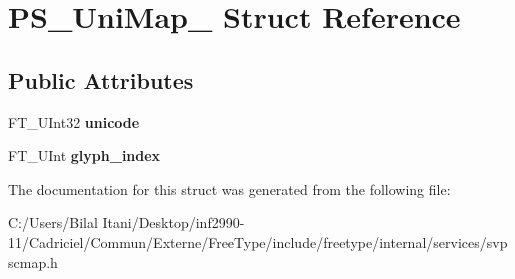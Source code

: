 \hypertarget{struct_p_s___uni_map__}{}\section{P\+S\+\_\+\+Uni\+Map\+\_\+ Struct Reference}
\label{struct_p_s___uni_map__}
\subsection*{Public Attributes}
\begin{DoxyCompactItemize}
\item 
F\+T\+\_\+\+U\+Int32 {\bfseries unicode}\hypertarget{struct_p_s___uni_map___a87c1f471eb4033fc5ed9d0f1ecaf35a1}{}\label{struct_p_s___uni_map___a87c1f471eb4033fc5ed9d0f1ecaf35a1}

\item 
F\+T\+\_\+\+U\+Int {\bfseries glyph\+\_\+index}\hypertarget{struct_p_s___uni_map___a0d5b2e3c405aeab1f1059a3587125cfd}{}\label{struct_p_s___uni_map___a0d5b2e3c405aeab1f1059a3587125cfd}

\end{DoxyCompactItemize}


The documentation for this struct was generated from the following file\+:\begin{DoxyCompactItemize}
\item 
C\+:/\+Users/\+Bilal Itani/\+Desktop/inf2990-\/11/\+Cadriciel/\+Commun/\+Externe/\+Free\+Type/include/freetype/internal/services/svpscmap.\+h\end{DoxyCompactItemize}
